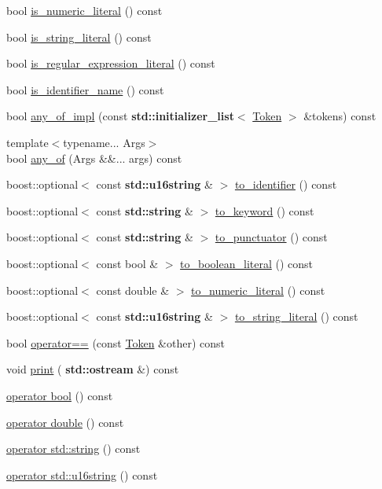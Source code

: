 \begin{DoxyCompactItemize}
\item 
bool \hyperlink{class_token_acf4f9a4d866ea0b67054b01cd4ea4f0f}{is\+\_\+numeric\+\_\+literal} () const
\item 
bool \hyperlink{class_token_ad11f807932449af30ca904eac2e4a350}{is\+\_\+string\+\_\+literal} () const
\item 
bool \hyperlink{class_token_a067bf14791d50fb4d98f3bb67de26307}{is\+\_\+regular\+\_\+expression\+\_\+literal} () const
\item 
bool \hyperlink{class_token_a00ae85f794f2c6a2da22b1454ecd4e84}{is\+\_\+identifier\+\_\+name} () const
\item 
bool \hyperlink{class_token_abefa8f417ddd59dcb37a2cfd357a51bf}{any\+\_\+of\+\_\+impl} (const \textbf{ std\+::initializer\+\_\+list}$<$ \hyperlink{class_token}{Token} $>$ \&tokens) const
\item 
{\footnotesize template$<$typename... Args$>$ }\\bool \hyperlink{class_token_a6dd181cd1f4570aff7d7ddd5714ca582}{any\+\_\+of} (Args \&\&... args) const
\item 
boost\+::optional$<$ const \textbf{ std\+::u16string} \& $>$ \hyperlink{class_token_a26d2e0e166ea03a4a7c2a7b77d456283}{to\+\_\+identifier} () const
\item 
boost\+::optional$<$ const \textbf{ std\+::string} \& $>$ \hyperlink{class_token_a4438811e8b488dc71a8ae518368cc962}{to\+\_\+keyword} () const
\item 
boost\+::optional$<$ const \textbf{ std\+::string} \& $>$ \hyperlink{class_token_ad68665bd46eea1e372e6ed9dade2f713}{to\+\_\+punctuator} () const
\item 
boost\+::optional$<$ const bool \& $>$ \hyperlink{class_token_a1be97c731f423827dd4725de8eb2a41f}{to\+\_\+boolean\+\_\+literal} () const
\item 
boost\+::optional$<$ const double \& $>$ \hyperlink{class_token_a6f9a344002940cb1ee6e29a7ae9a178a}{to\+\_\+numeric\+\_\+literal} () const
\item 
boost\+::optional$<$ const \textbf{ std\+::u16string} \& $>$ \hyperlink{class_token_a90405a7051a618d8f838bb2abee8709d}{to\+\_\+string\+\_\+literal} () const
\item 
bool \hyperlink{class_token_a20c14983ac6c11ffb89135e2cd91169f}{operator==} (const \hyperlink{class_token}{Token} \&other) const
\item 
void \hyperlink{class_token_a50f3ddd1f75c6ae38e0156dd16796a9e}{print} (\textbf{ std\+::ostream} \&) const
\item 
\hyperlink{class_token_a34140d60656a12bbfcdfbcf85e985133}{operator bool} () const
\item 
\hyperlink{class_token_a9d9ecf295a7bb23922db6ea5b9e97833}{operator double} () const
\item 
\hyperlink{class_token_a37a03ca940a3abaec1491c9306bafa2a}{operator std\+::string} () const
\item 
\hyperlink{class_token_a4a746b837b7c624604a093eef1e88b12}{operator std\+::u16string} () const
\end{DoxyCompactItemize}
